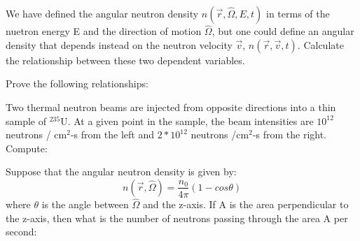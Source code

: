 \documentclass[12pts,answers,addpoints]{exam}
\begin{document}
\begin{questions}
  \question[10] We have defined the angular neutron density $n(\vec{r},
  \hat{\Omega}, E, t)$ in terms of the nuetron energy E and the direction of
  motion $\hat{\Omega}$, but one could define an angular density that depends
  instead on the neutron velocity $\vec{v}$, $n(\vec{r}, \vec{v}, t)$. Calculate
  the relationship between these two dependent variables.

  \question Prove the following relationships:

        \question Two thermal neutron beams are injected from opposite
        directions into a thin sample of $^{235}$U. At a given point in the
        sample, the beam intensities are $10^{12}$ neutrons / cm$^2$-s
        from the left and $2*10^{12}$ neutrons /cm$^2$-s from the right.
        Compute:
        \question Suppose that the angular neutron density is given by:
        \begin{equation*}
          n(\vec{r}, \hat{\Omega}) = \frac{n_0}{4\pi}(1-cos \theta)
        \end{equation*}
        where $\theta$ is the angle between $\hat{\Omega}$ and the z-axis. If A
        is the area perpendicular to the z-axis, then what is the number of
        neutrons passing through the area A per second:
        \begin{parts}

\end{parts}
\end{questions}
\end{document}
